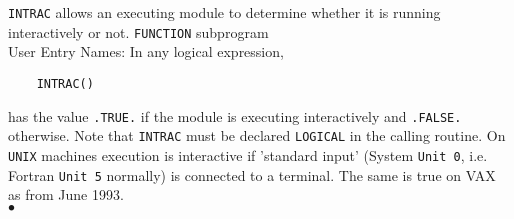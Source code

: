                         
\Submitter{}                              
           
{\tt INTRAC} allows an executing module to determine whether it
is running interactively or not.
\Structure
{\tt FUNCTION} subprogram \\
User Entry Names: 
\Usage
In any logical expression,
\begin{verbatim}
    INTRAC()
\end{verbatim}
has the value {\tt .TRUE.} if the module is executing interactively and
{\tt .FALSE.} otherwise.
Note that {\tt INTRAC}
must be declared {\tt LOGICAL} in the calling routine.
\Method
On {\tt UNIX} machines execution is interactive if 'standard input'
(System {\tt Unit 0}, i.e. Fortran {\tt Unit 5} normally) is
connected to a terminal. The same is true on VAX as from June 1993.
\\ $\bullet$
